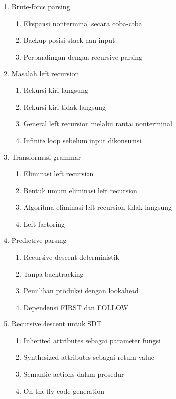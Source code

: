 \begin{enumerate}
\begin{enumerate}
        \item \ppaham Keterbatasan implementasi boolean sederhana
    \end{enumerate}
    \item \ppaham Brute-force parsing
    \begin{enumerate}
        \item \ppaham Ekspansi nonterminal secara coba-coba
        \item \ppaham Backup posisi stack dan input
        \item \ppaham Perbandingan dengan recursive parsing
    \end{enumerate}
    \item \pwajib Masalah left recursion
    \begin{enumerate}
        \item \pwajib Rekursi kiri langsung
        \item \ppaham Rekursi kiri tidak langsung
        \item \ppaham General left recursion melalui rantai nonterminal
        \item \pwajib Infinite loop sebelum input dikonsumsi
    \end{enumerate}
    \item \pwajib Transformasi grammar
    \begin{enumerate}
        \item \pwajib Eliminasi left recursion
        \item \pwajib Bentuk umum eliminasi left recursion
        \item \ppaham Algoritma eliminasi left recursion tidak langsung
        \item \pwajib Left factoring
    \end{enumerate}
    \item \ppaham Predictive parsing
    \begin{enumerate}
        \item \ppaham Recursive descent deterministik
        \item \ppaham Tanpa backtracking
        \item \ppaham Pemilihan produksi dengan lookahead
        \item \ppaham Dependensi FIRST dan FOLLOW
    \end{enumerate}
    \item \ppaham Recursive descent untuk SDT
    \begin{enumerate}
        \item \ppaham Inherited attributes sebagai parameter fungsi
        \item \ppaham Synthesized attributes sebagai return value
        \item \ppaham Semantic actions dalam prosedur
        \item \ppaham On-the-fly code generation
    \end{enumerate}
\end{enumerate}

